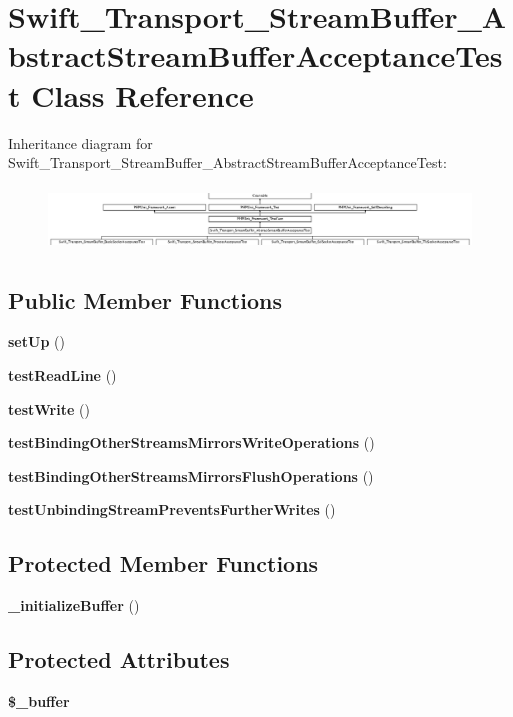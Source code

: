 \section{Swift\+\_\+\+Transport\+\_\+\+Stream\+Buffer\+\_\+\+Abstract\+Stream\+Buffer\+Acceptance\+Test Class Reference}
\label{class_swift___transport___stream_buffer___abstract_stream_buffer_acceptance_test}
Inheritance diagram for Swift\+\_\+\+Transport\+\_\+\+Stream\+Buffer\+\_\+\+Abstract\+Stream\+Buffer\+Acceptance\+Test\+:\begin{figure}[H]
\begin{center}
\leavevmode
\includegraphics[height=1.715686cm]{class_swift___transport___stream_buffer___abstract_stream_buffer_acceptance_test}
\end{center}
\end{figure}
\subsection*{Public Member Functions}
\begin{DoxyCompactItemize}
\item 
{\bf set\+Up} ()
\item 
{\bf test\+Read\+Line} ()
\item 
{\bf test\+Write} ()
\item 
{\bf test\+Binding\+Other\+Streams\+Mirrors\+Write\+Operations} ()
\item 
{\bf test\+Binding\+Other\+Streams\+Mirrors\+Flush\+Operations} ()
\item 
{\bf test\+Unbinding\+Stream\+Prevents\+Further\+Writes} ()
\end{DoxyCompactItemize}
\subsection*{Protected Member Functions}
\begin{DoxyCompactItemize}
\item 
{\bf \+\_\+initialize\+Buffer} ()
\end{DoxyCompactItemize}
\subsection*{Protected Attributes}
\begin{DoxyCompactItemize}
\item 
{\bf \$\+\_\+buffer}
\end{DoxyCompactItemize}
